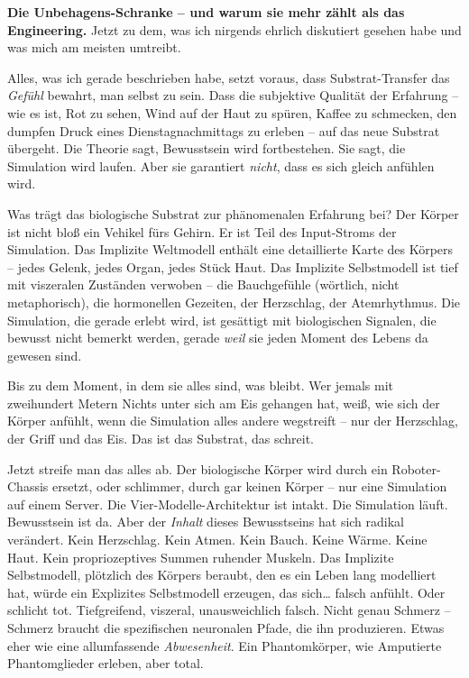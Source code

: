 \documentclass[11pt, twoside, openright]{book}
\begin{document}
\textbf{Die Unbehagens-Schranke -- und warum sie mehr zählt als das Engineering.} Jetzt zu dem, was ich nirgends ehrlich diskutiert gesehen habe und was mich am meisten umtreibt.

Alles, was ich gerade beschrieben habe, setzt voraus, dass Substrat-Transfer das \textit{Gefühl} bewahrt, man selbst zu sein. Dass die subjektive Qualität der Erfahrung -- wie es ist, Rot zu sehen, Wind auf der Haut zu spüren, Kaffee zu schmecken, den dumpfen Druck eines Dienstagnachmittags zu erleben -- auf das neue Substrat übergeht. Die Theorie sagt, Bewusstsein wird fortbestehen. Sie sagt, die Simulation wird laufen. Aber sie garantiert \textit{nicht}, dass es sich gleich anfühlen wird.

Was trägt das biologische Substrat zur phänomenalen Erfahrung bei? Der Körper ist nicht bloß ein Vehikel fürs Gehirn. Er ist Teil des Input-Stroms der Simulation. Das Implizite Weltmodell enthält eine detaillierte Karte des Körpers -- jedes Gelenk, jedes Organ, jedes Stück Haut. Das Implizite Selbstmodell ist tief mit viszeralen Zuständen verwoben -- die Bauchgefühle (wörtlich, nicht metaphorisch), die hormonellen Gezeiten, der Herzschlag, der Atemrhythmus. Die Simulation, die gerade erlebt wird, ist gesättigt mit biologischen Signalen, die bewusst nicht bemerkt werden, gerade \textit{weil} sie jeden Moment des Lebens da gewesen sind.

Bis zu dem Moment, in dem sie alles sind, was bleibt. Wer jemals mit zweihundert Metern Nichts unter sich am Eis gehangen hat, weiß, wie sich der Körper anfühlt, wenn die Simulation alles andere wegstreift -- nur der Herzschlag, der Griff und das Eis. Das ist das Substrat, das schreit.

Jetzt streife man das alles ab. Der biologische Körper wird durch ein Roboter-Chassis ersetzt, oder schlimmer, durch gar keinen Körper -- nur eine Simulation auf einem Server. Die Vier-Modelle-Architektur ist intakt. Die Simulation läuft. Bewusstsein ist da. Aber der \textit{Inhalt} dieses Bewusstseins hat sich radikal verändert. Kein Herzschlag. Kein Atmen. Kein Bauch. Keine Wärme. Keine Haut. Kein propriozeptives Summen ruhender Muskeln. Das Implizite Selbstmodell, plötzlich des Körpers beraubt, den es ein Leben lang modelliert hat, würde ein Explizites Selbstmodell erzeugen, das sich\ldots{} falsch anfühlt. Oder schlicht tot. Tiefgreifend, viszeral, unausweichlich falsch. Nicht genau Schmerz -- Schmerz braucht die spezifischen neuronalen Pfade, die ihn produzieren. Etwas eher wie eine allumfassende \textit{Abwesenheit}. Ein Phantomkörper, wie Amputierte Phantomglieder erleben, aber total.
\end{document}
